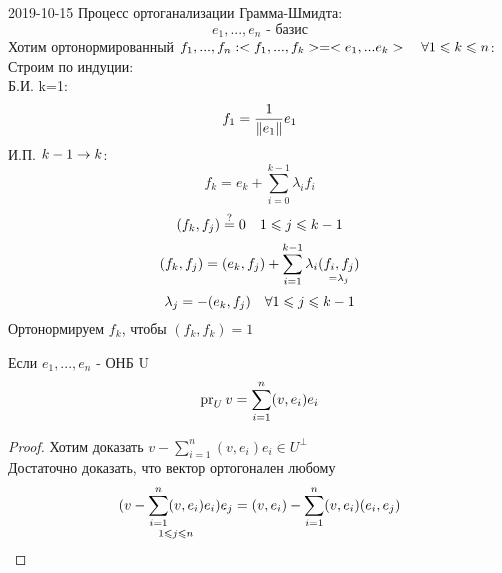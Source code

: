 \documentclass[12pt, fleqn]{article}
\begin{document}
\begin{lect} {2019-10-15}
    Процесс ортоганализации Грамма-Шмидта:
    \[e_1,...,e_n \text{ - базис}\]
    Хотим ортонормированный $f_1,...,f_n: <f_1,...,f_k> = <e_1,... e_k>\quad \forall 1 \leqslant k \leqslant n$:\\
    Строим по индуции:\\
    Б.И. k=1:
    \[f_1 = \dfrac{1}{\lVert e_1 \rVert} e_1\]
    И.П. $k-1 \rightarrow k$:
    \[f_k = e_k + \sum_{i=0}^{k-1} \lambda_i f_i\]
		\[(f_k, f_j) \overset{?}{=} 0 \quad 1 \leqslant j \leqslant k-1\]
		\[(f_k, f_j) = (e_k, f_j) + \sum_{i=1}^{k-1} \lambda_i \underset{= \lambda_j}{(f_i, f_j)}\]
		\[\lambda_j = - (e_k, f_j) \quad \forall 1 \leqslant j \leqslant k-1\]
		Ортонормируем $f_k$, чтобы $(f_k, f_k)=1$

		\begin{utv}
			Если $e_1,...,e_n$ - ОНБ U
			\[\mathop{\rm pr}\nolimits_U v = \sum_{i=1}^n (v, e_i) e_i\]
		\end{utv}

		\begin{proof}
			Хотим доказать $v - \sum_{i=1}^n (v, e_i) e_i \in U^{\bot}$\\
			Достаточно доказать, что вектор ортогонален любому
			\[\underset{1 \leqslant j \leqslant n}{(v - \sum_{i=1}^n (v, e_i) e_i) e_j} = (v, e_i) - \sum_{i=1}^n (v, e_i) (e_i, e_j)\]
		\end{proof}

\end{lect}
\end{document}
